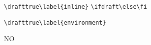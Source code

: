 \newif\ifdraft
\verb|\drafttrue\label{inline}|
\verb*+\ifdraft\else\fi+
\begin{verbatim}
\drafttrue\label{environment}
\end{verbatim}
\newcommand{\stored}{\drafttrue\label{body}}
\ifdraft YES\else NO\fi
